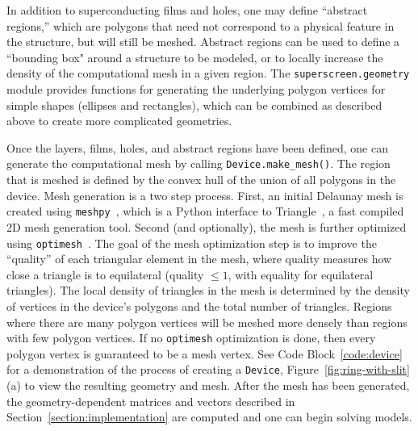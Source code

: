 \documentclass[final,3p,times]{elsarticle}
\newcommand{\inline}[1]{\texttt{#1}\xspace}
\begin{document}
In addition to superconducting films and holes, one may define ``abstract regions,'' which are polygons that need not correspond to a physical feature in the structure, but will still be meshed. Abstract regions can be used to define a ``bounding box" around a structure to be modeled, or to locally increase the density of the computational mesh in a given region. The \inline{superscreen.geometry} module provides functions for generating the underlying polygon vertices for simple shapes (ellipses and rectangles), which can be combined as described above to create more complicated geometries.


Once the layers, films, holes, and abstract regions have been defined, one can generate the computational mesh by calling \inline{Device.make_mesh()}. The region that is meshed is defined by the convex hull of the union of all polygons in the device. Mesh generation is a two step process. First, an initial Delaunay mesh is created using \inline{meshpy}~\cite{Klockner}, which is a Python interface to Triangle~\cite{Shewchuk1996-va, Shewchuk}, a fast compiled 2D mesh generation tool. Second (and optionally), the mesh is further optimized using \inline{optimesh}~\cite{Schlomer2021-ua}. The goal of the mesh optimization step is to improve the ``quality'' of each triangular element in the mesh, where quality measures how close a triangle is to equilateral (quality $\leq1$, with equality for equilateral triangles).
The local density of triangles in the mesh is determined by the density of vertices in the device's polygons and the total number of triangles. Regions where there are many polygon vertices will be meshed more densely than regions with few polygon vertices. If no \inline{optimesh} optimization is done, then every polygon vertex is guaranteed to be a mesh vertex. See Code Block~\ref{code:device} for a demonstration of the process of creating a \inline{Device}, Figure~\ref{fig:ring-with-slit}(a) to view the resulting geometry and mesh. After the mesh has been generated, the geometry-dependent matrices and vectors described in Section~\ref{section:implementation} are computed and one can begin solving models.
\end{document}
